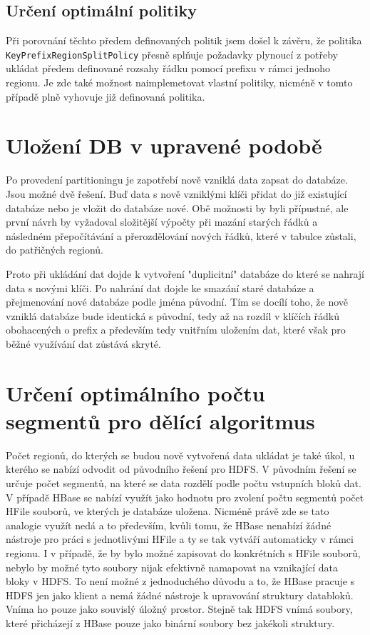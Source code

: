 \documentclass[thesis=M,czech]{FITthesis}[2012/06/26]
\begin{document}
\subsection{Určení optimální politiky}
Při porovnání těchto předem definovaných politik jsem došel k závěru, že politika \texttt{KeyPrefixRegionSplitPolicy} přesně splňuje požadavky plynoucí z potřeby ukládat předem definované rozsahy řádku pomocí prefixu v rámci jednoho regionu. Je zde také možnost naimplemetovat vlastní politiky, nicméně v tomto případě plně vyhovuje již definovaná politika.

\section{Uložení DB v upravené podobě}
Po provedení  partitioningu je zapotřebí nově vzniklá data zapsat do databáze. Jsou možné dvě řešení. Buď data s nově vzniklými klíči přidat do již existující databáze nebo je vložit do databáze nové. Obě možnosti by byli přípustné, ale první návrh by vyžadoval složitější výpočty při mazání starých řádků a následném přepočítávání a přerozdělování nových řádků, které v tabulce zůstali, do patřičných regionů. 

Proto při ukládání dat dojde k vytvoření "duplicitní" databáze do které se nahrají data s novými klíči. Po nahrání dat dojde ke smazání staré databáze a přejmenování nové databáze podle jména původní. Tím se docílí toho, že nově vzniklá databáze bude identická s původní, tedy až na rozdíl v klíčích řádků obohacených o prefix a především tedy vnitřním uložením dat, které však pro běžné využívání dat zůstává skryté. 

\section{Určení optimálního počtu segmentů pro dělící algoritmus}
Počet regionů, do kterých se budou nově vytvořená data ukládat je také úkol, u kterého se nabízí odvodit od původního řešení pro HDFS. V původním řešení se určuje počet segmentů, na které se data rozdělí podle počtu vstupních bloků dat. V případě HBase se nabízí využít jako hodnotu pro zvolení počtu segmentů počet HFile souborů, ve kterých je databáze uložena. Nicméně právě zde se tato analogie využít nedá a to především, kvůli tomu, že HBase nenabízí žádné nástroje pro práci s jednotlivými HFile a ty se tak vytváří automaticky v rámci regionu. I v případě, že by bylo možné zapisovat do konkrétních s HFile souborů, nebylo by možné tyto soubory nijak efektivně namapovat na vznikající data bloky v HDFS. To není možné z jednoduchého důvodu a to, že HBase pracuje s HDFS jen jako klient a nemá žádné nástroje k upravování struktury databloků. Vníma ho pouze jako souvislý úložný prostor. Stejně tak HDFS vnímá soubory, které přicházejí z HBase pouze jako binární soubory bez jakékoli struktury.
\end{document}
